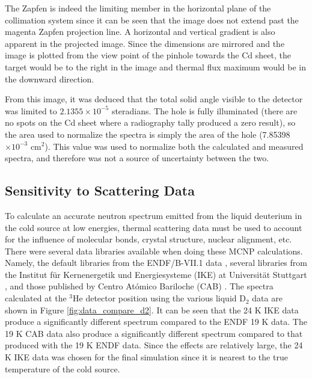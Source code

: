 \documentclass[5p,12pt]{elsarticle}
\begin{document}
The Zapfen is indeed the limiting member in the horizontal plane of the collimation system since it can be seen that the image does not extend past the magenta Zapfen projection line.  A horizontal and vertical gradient is also apparent in the projected image.  Since the dimensions are mirrored and the image is plotted from the view point of the pinhole towards the Cd sheet, the target would be to the right in the image and thermal flux maximum would be in the downward direction.

From this image, it was deduced that the total solid angle visible to the detector was limited to $2.1355\times10^{-5}$ steradians.  The hole is fully illuminated (there are no spots on the Cd sheet where a radiography tally produced a zero result), so the area used to normalize the spectra is simply the area of the hole (7.85398$\times 10^{-3}$ cm$^2$).  This value was used to normalize both the calculated and measured spectra, and therefore was not a source of uncertainty between the two.  

%
%
%
%
%

\subsection{Sensitivity to Scattering Data}
\label{subsec:data}

To calculate an accurate neutron spectrum emitted from the liquid deuterium in the cold source at low energies, thermal scattering data must be used to account for the influence of molecular bonds, crystal structure, nuclear alignment, etc.   There were several data libraries available when doing these MCNP calculations.  Namely, the default libraries from the ENDF/B-VII.1 data \cite{mcnp6}, several libraries from the Institut f\"{u}r Kernenergetik und Energiesysteme (IKE) at Universit\"{a}t Stuttgart \cite{IKE}, and those published by Centro At\'{o}mico Bariloche (CAB) \cite{granada_d2}.  The spectra calculated at the $^3$He detector position using the various liquid D$_2$ data are shown in Figure \ref{fig:data_compare_d2}.  It can be seen that the 24 K IKE data produce a significantly different spectrum compared to the ENDF 19 K data.  The 19 K CAB data also produce a significantly different spectrum compared to that produced with the 19 K ENDF data.  Since the effects are relatively large, the 24 K IKE data was chosen for the final simulation since it is nearest to the true temperature of the cold source.
\end{document}
